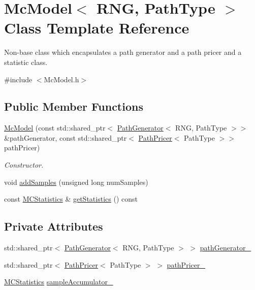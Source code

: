 \hypertarget{class_mc_model}{}\section{Mc\+Model$<$ R\+NG, Path\+Type $>$ Class Template Reference}
\label{class_mc_model}


Non-\/base class which encapsulates a path generator and a path pricer and a statistic class.  




{\ttfamily \#include $<$Mc\+Model.\+h$>$}

\subsection*{Public Member Functions}
\begin{DoxyCompactItemize}
\item 
\hyperlink{class_mc_model_a2c4ccfd7b882e80516e1f9733243e48d}{Mc\+Model} (const std\+::shared\+\_\+ptr$<$ \hyperlink{class_path_generator}{Path\+Generator}$<$ R\+NG, Path\+Type $>$$>$ \&path\+Generator, const std\+::shared\+\_\+ptr$<$ \hyperlink{class_path_pricer}{Path\+Pricer}$<$ Path\+Type $>$$>$ path\+Pricer)
\begin{DoxyCompactList}\small\item\em Constructor. \end{DoxyCompactList}\item 
void \hyperlink{class_mc_model_a6ce369cb607a221259e4a93bb63ea4ec}{add\+Samples} (unsigned long num\+Samples)
\item 
const \hyperlink{class_m_c_statistics}{M\+C\+Statistics} \& \hyperlink{class_mc_model_a07af7562a83c0bc16ba822ac52154684}{get\+Statistics} () const
\end{DoxyCompactItemize}
\subsection*{Private Attributes}
\begin{DoxyCompactItemize}
\item 
std\+::shared\+\_\+ptr$<$ \hyperlink{class_path_generator}{Path\+Generator}$<$ R\+NG, Path\+Type $>$ $>$ \hyperlink{class_mc_model_abb4ba15045ba3c05d2f54340a63a1000}{path\+Generator\+\_\+}
\item 
std\+::shared\+\_\+ptr$<$ \hyperlink{class_path_pricer}{Path\+Pricer}$<$ Path\+Type $>$ $>$ \hyperlink{class_mc_model_aa05affe30ae38a403977d3b708d46608}{path\+Pricer\+\_\+}
\item 
\hyperlink{class_m_c_statistics}{M\+C\+Statistics} \hyperlink{class_mc_model_a3ec600743d8341a4cd46b5005a0f70ff}{sample\+Accumulator\+\_\+}
\end{DoxyCompactItemize}


